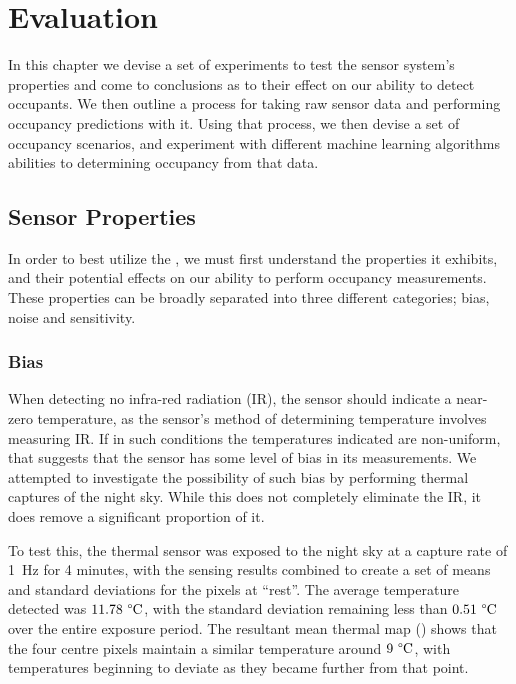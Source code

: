 \documentclass[../thesis/thesis.tex]{subfiles}
\begin{document}
 \chapter{Evaluation}
 \label{chap:evaluation}

In this chapter we devise a set of experiments to test the sensor system's properties and come to conclusions as to their effect on our ability to detect occupants. We then outline a process for taking raw sensor data and performing occupancy predictions with it. Using that process, we then devise a set of occupancy scenarios, and experiment with different machine learning algorithms abilities to determining occupancy from that data.

\section{Sensor Properties}

In order to best utilize the \mlx, we must first understand the properties it exhibits, and their potential effects on our ability to perform occupancy measurements. These properties can be broadly separated into three different categories; bias, noise and sensitivity.

\subsection{Bias}
When detecting no infra-red radiation (IR), the sensor should indicate a near-zero temperature, as the sensor's method of determining temperature involves measuring IR. If in such conditions the temperatures indicated are non-uniform, that suggests that the sensor has some level of bias in its measurements. We attempted to investigate the possibility of such bias by performing thermal captures of the night sky. While this does not completely eliminate the IR, it does remove a significant proportion of it.

To test this, the thermal sensor was exposed to the night sky at a capture rate of 1~Hz for 4 minutes, with the sensing results combined to create a set of means and standard deviations for the pixels at ``rest''. The average temperature detected was $11.78~\degree\textrm{C}$, with the standard deviation remaining less than $0.51~\degree\textrm{C}$ over the entire exposure period. The resultant mean thermal map () shows that the four centre pixels maintain a similar temperature around $9~\degree\textrm{C}$, with temperatures beginning to deviate as they became further from that point.
\end{document}
